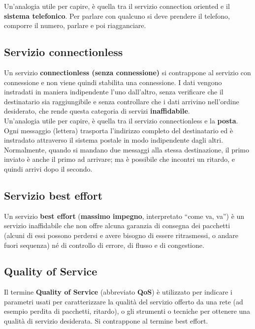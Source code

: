         Un’analogia utile per capire, è quella tra il servizio connection oriented e il \textbf{sistema telefonico}.
        Per parlare con qualcuno si deve prendere il telefono, comporre il numero, parlare e poi
        riagganciare.

    \subsection{Servizio connectionless}
        Un servizio \textbf{connectionless (senza connessione)} si contrappone al servizio con connessione
        e non viene quindi stabilita una connessione. I dati vengono instradati in maniera indipendente
        l’uno dall’altro, senza verificare che il destinatario sia raggiungibile e senza controllare che i
        dati arrivino nell’ordine desiderato, che rende questa categoria di servizi \textbf{inaffidabile}.\\

        Un’analogia utile per capire, è quella tra il servizio connectionless e la \textbf{posta}. Ogni messaggio
        (lettera) trasporta l’indirizzo completo del destinatario ed è instradato attraverso il sistema
        postale in modo indipendente dagli altri. Normalmente, quando si mandano due messaggi alla
        stessa destinazione, il primo inviato è anche il primo ad arrivare; ma è possibile che incontri un
        ritardo, e quindi arrivi dopo il secondo.

    \subsection{Servizio best effort}
        Un servizio \textbf{best effort} (\textbf{massimo impegno}, interpretato “come va, va”) è un servizio
        inaffidabile che non offre alcuna garanzia di consegna dei pacchetti (alcuni di essi possono
        perdersi e avere bisogno di essere ritrasmessi, o andare fuori sequenza) né di controllo di
        errore, di flusso e di congestione.

    \subsection{Quality of Service}
        Il termine \textbf{Quality of Service} (abbreviato \textbf{QoS}) è utilizzato per indicare i parametri usati per
        caratterizzare la qualità del servizio offerto da una rete (ad esempio perdita di pacchetti,
        ritardo), o gli strumenti o tecniche per ottenere una qualità di servizio desiderata. Si
        contrappone al termine best effort.

